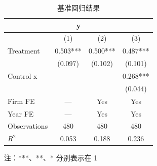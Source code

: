 \begin{table}[htbp]
\centering
\caption{基准回归结果}
\label{tab:main}
\begin{tabular}{lccc}
\toprule
\multicolumn{4}{c}{y} \\
\midrule
 & (1) & (2) & (3) \\
\midrule
Treatment & 0.503*** & 0.500*** & 0.487*** \\
 & (0.097) & (0.102) & (0.101) \\
\addlinespace[0.3ex]
Control x &  &  & 0.268*** \\
 &  &  & (0.044) \\
\addlinespace[0.3ex]
\midrule
Firm FE & --- & Yes & Yes \\
Year FE & --- & Yes & Yes \\
\addlinespace[0.3ex]
\midrule
Observations & 480 & 480 & 480 \\
$R^2$ & 0.053 & 0.188 & 0.236 \\
\bottomrule
\end{tabular}
\par\smallskip\footnotesize 注：***、**、* 分别表示在 1%
\end{table}
